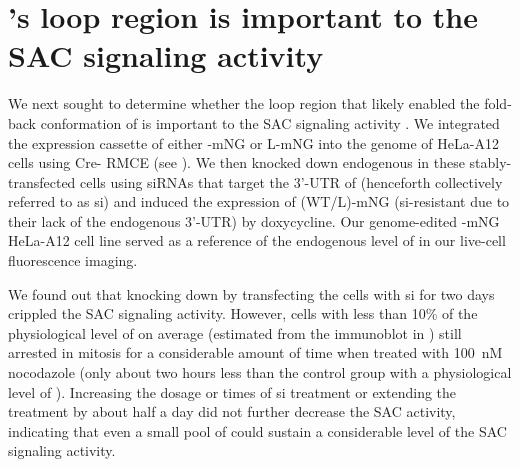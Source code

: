 \section{'s loop region is important to the SAC signaling activity }
\label{LoopDeletionSection}

We next sought to determine whether the loop region that likely enabled the fold-back conformation of  is important to the SAC signaling activity . We integrated the expression cassette of either -mNG or \textDelta{}L-mNG into the genome of HeLa-A12 cells using Cre- RMCE (see ). We then knocked down endogenous  in these stably-transfected cells using siRNAs that target the 3'-UTR of  \cite{siMAD1-3UTR} (henceforth collectively referred to as si) and induced the expression of (WT/\textDelta{}L)-mNG (si-resistant due to their lack of the endogenous 3'-UTR) by doxycycline. Our genome-edited -mNG HeLa-A12 cell line served as a reference of the endogenous level of  in our live-cell fluorescence imaging.

We found out that knocking down  by transfecting the cells with si for two days crippled the SAC signaling activity. However, cells with less than 10\% of the physiological level of  on average (estimated from the immunoblot in ) still arrested in mitosis for a considerable amount of time when treated with \SI{100}{nM} nocodazole (only about two hours less than the control group with a physiological level of ). Increasing the dosage or times of si treatment or extending the treatment by about half a day did not further decrease the SAC activity, indicating that even a small pool of  could sustain a considerable level of the SAC signaling activity.


